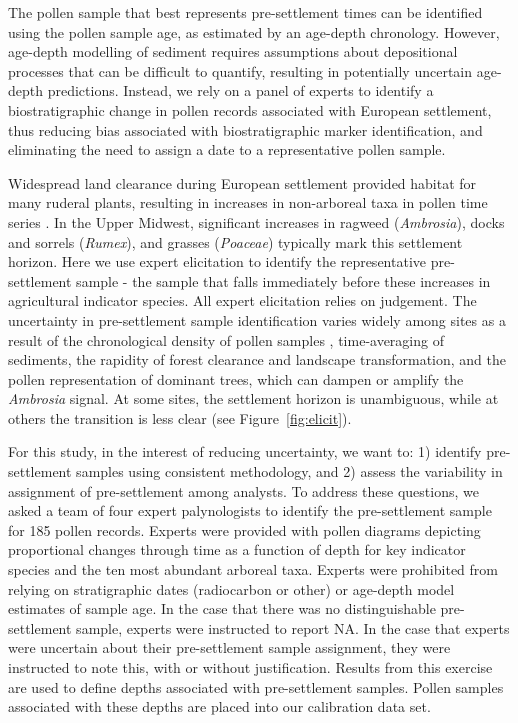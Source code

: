 \documentclass[12pt]{article}
\begin{document}
The pollen sample that best represents pre-settlement times can be
identified using the pollen sample age, as estimated by an age-depth
chronology. However, age-depth modelling of sediment requires
assumptions about depositional processes that can be difficult to
quantify, resulting in potentially uncertain age-depth
predictions. Instead, we rely on a panel of experts to identify a
biostratigraphic change in pollen records associated with European
settlement, thus reducing bias associated with biostratigraphic marker
identification, and eliminating the need to assign a date to a
representative pollen sample.

Widespread land clearance during European settlement provided habitat
for many ruderal plants, resulting in increases in non-arboreal taxa
in pollen time series \citep{mcandrews1988human}. In the Upper
Midwest, significant increases in ragweed (\textit{Ambrosia}), docks
and sorrels (\textit{Rumex}), and grasses (\textit{Poaceae}) typically
mark this settlement horizon. Here we use expert elicitation to
identify the representative pre-settlement sample - the sample that
falls immediately before these increases in agricultural indicator
species. All expert elicitation relies on judgement. The uncertainty
in pre-settlement sample identification varies widely among sites as a
result of the chronological density of pollen samples
\citep{liu2012temporal}, time-averaging of sediments, the rapidity of
forest clearance and landscape transformation, and the pollen
representation of dominant trees, which can dampen or amplify the
\textit{Ambrosia} signal. At some sites, the settlement horizon is
unambiguous, while at others the transition is less clear (see
Figure~\ref{fig:elicit}).

For this study, in the interest of reducing uncertainty, we want to:
1) identify pre-settlement samples using consistent methodology, and
2) assess the variability in assignment of pre-settlement among
analysts. To address these questions, we asked a team of four expert
palynologists to identify the pre-settlement sample for 185 pollen
records. Experts were provided with pollen diagrams depicting
proportional changes through time as a function of depth for key
indicator species and the ten most abundant arboreal taxa. Experts
were prohibited from relying on stratigraphic dates (radiocarbon or
other) or age-depth model estimates of sample age. In the case that
there was no distinguishable pre-settlement sample, experts were
instructed to report NA. In the case that experts were uncertain about
their pre-settlement sample assignment, they were instructed to note
this, with or without justification. Results from this exercise are
used to define depths associated with pre-settlement samples. Pollen
samples associated with these depths are placed into our calibration
data set.
\end{document}
